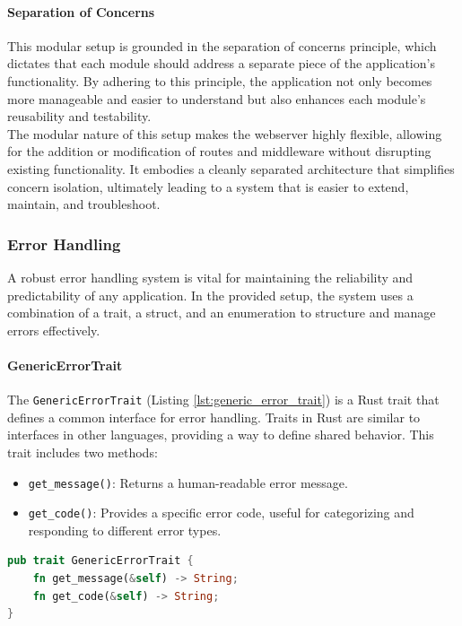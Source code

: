 \paragraph{Separation of Concerns}
This modular setup is grounded in the separation of concerns principle, which dictates that each module should address a separate piece of the application's functionality. By adhering to this principle, the application not only becomes more manageable and easier to understand but also enhances each module's reusability and testability. \\

The modular nature of this setup makes the webserver highly flexible, allowing for the addition or modification of routes and middleware without disrupting existing functionality. It embodies a cleanly separated architecture that simplifies concern isolation, ultimately leading to a system that is easier to extend, maintain, and troubleshoot.

\subsubsection{Error Handling}
A robust error handling system is vital for maintaining the reliability and predictability of any application. In the provided setup, the system uses a combination of a trait, a struct, and an enumeration to structure and manage errors effectively.

\paragraph{GenericErrorTrait}
The \texttt{GenericErrorTrait} (Listing \ref{lst:generic_error_trait}) is a Rust trait that defines a common interface for error handling. Traits in Rust are similar to interfaces in other languages, providing a way to define shared behavior. This trait includes two methods:
\begin{itemize}
    \item \texttt{get\_message()}: Returns a human-readable error message.
    \item \texttt{get\_code()}: Provides a specific error code, useful for categorizing and responding to different error types.
\end{itemize}

\begin{lstlisting}[language=rust, caption={GenericErrorTrait Utils Module}, label=lst:generic_error_trait]
pub trait GenericErrorTrait {
    fn get_message(&self) -> String;
    fn get_code(&self) -> String;
}
\end{lstlisting}

